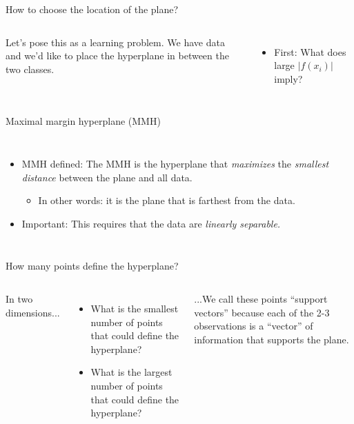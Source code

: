 \documentclass[mathserif, aspectratio=169]{beamer}
\begin{document}
\begin{frame}{How to choose the location of the plane?}
\begin{columns}
Let's pose this as a learning problem.  We have data and we'd like to place the hyperplane in between the two classes.

\begin{itemize}
\item First: What does  large $|f(x_i)|$ imply?  
\end{itemize}
\vspace{5mm}


\end{columns}
\end{frame}

\begin{frame}{Maximal margin hyperplane (MMH)}

\begin{columns}
\begin{itemize}
\item MMH defined: The MMH is the hyperplane that \textit{maximizes} the \textit{smallest distance} between the plane and all data.
\begin{itemize}
\item In other words: it is the plane that is farthest from the data.
\end{itemize}
\item Important: This requires that the data are \textit{linearly separable.  }
\end{itemize}

\end{columns}
\end{frame}

\begin{frame}{How many points define the hyperplane?}

\begin{columns}
In two dimensions...
\begin{itemize}
\item What is the smallest number of points that could define the hyperplane?
\vspace{5mm}
\item What is the largest number of points that could define the hyperplane?
\vspace{5mm}
\end{itemize}
...We call these points ``support vectors'' because each of the 2-3 observations is a ``vector'' of information that supports the plane.

\end{columns}

\end{frame}
\end{document}
